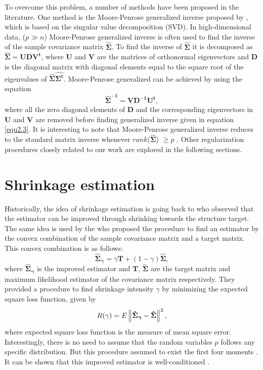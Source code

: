       To overcome this problem, a number of methods have been proposed in the literature. One method is the Moore-Penrose generalized inverse proposed by \cite{penrose1955generalized}, which is based on the singular value decomposition (SVD). In high-dimensional data, ($p \gg n$) Moore-Penrose generalized inverse is often used to find the inverse of the sample covariance matrix $\boldsymbol{\hat{\Sigma}}$. To find the inverse of $\boldsymbol{\hat{\Sigma}}$ it is decomposed as $\boldsymbol{\hat{\Sigma}} = \boldsymbol{UDV^{t}}$, where $\boldsymbol{U}$ and $\boldsymbol{V}$ are the matrices of orthonormal eigenvectors and $\boldsymbol{D}$ is the diagonal matrix with diagonal elements equal to the square root of the eigenvalues of $\boldsymbol{\hat{\Sigma}\hat{\Sigma^{t}}}$. Moore-Penrose generalized can be achieved by using the equation
\begin{equation}
\boldsymbol{\hat{\Sigma}^{-1}} = \boldsymbol{VD^{-1}U^{t}},
\label{equ2.3}
\end{equation}       
where all the zero diagonal elements of $\boldsymbol{D}$ and the corresponding eigenvectors in $\boldsymbol{U}$ and $\boldsymbol{V}$ are removed before finding generalized inverse given in equation \ref{equ2.3}. It is interesting to note that Moore-Penrose generalized inverse reduces to the standard matrix inverse whenever $rank$($\boldsymbol{\hat{\Sigma}}$) $\geq p$ \citep{golub1965calculating}. Other regularization procedures closely related to our work are explored in the following sections. 

\section{Shrinkage estimation}   
Historically, the idea of shrinkage estimation is going back to \cite{stein1956inadmissibility} who observed that the estimator can be improved through shrinking towards the structure target. The same idea is used by the \cite{ledoit2004well} who proposed the procedure to find an estimator by the convex combination of the sample covariance matrix and a target matrix. This convex combination is as follows:   
\begin{equation}
\boldsymbol{\hat{\Sigma}_{\gamma}} = \gamma \boldsymbol{T} + (1-\gamma) \boldsymbol{\hat{\Sigma}},
\end{equation}       
where $\boldsymbol{\hat{\Sigma}_{\gamma}}$ is the improved estimator and $\boldsymbol{T}$, $\boldsymbol{\hat{\Sigma}}$ are the target matrix and maximum likelihood estimator of the covariance matrix respectively. They provided a procedure to find shrinkage intensity $\gamma$ by minimizing the expected square loss function, given by          
\begin{equation}
R(\gamma) = E \norm{\boldsymbol{\hat{\Sigma}_{\gamma}} - \boldsymbol{\hat{\Sigma}}}^2,
 \label{equ2.4}
\end{equation}           
where expected square loss function is the measure of mean square error. Interestingly, there is no need to assume that the random variables $p$ follows any specific distribution. But this procedure assumed to exist the first four moments \citep{schafer2005shrinkage}. It can be shown that this improved estimator is well-conditioned \citep{ledoit2004well}.     

